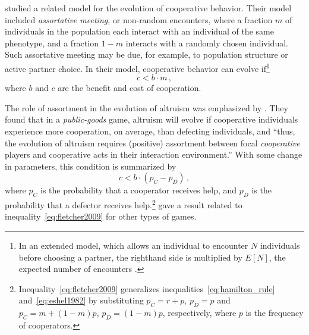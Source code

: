 \documentclass[12pt]{extarticle}
\begin{document}
\citet{Eshel1982} studied a related model for the evolution of cooperative behavior.
Their model included \emph{assortative meeting}, or non-random encounters, where a fraction $m$ of individuals in the population each interact with an individual of the same phenotype, and a fraction $1-m$ interacts  with a randomly chosen individual.  
Such assortative meeting may be due, for example, to population structure or active partner choice.
In their model, cooperative behavior can evolve if\footnote{In an extended model, which allows an individual to encounter $N$ individuals before choosing a partner, the righthand side is multiplied by $E[N]$, the expected number of encounters \citep[eq.~4.6]{Eshel1982}.
} 
\citep[eq.~3.2]{Eshel1982}
\begin{equation} \label{eq:eshel1982}
c < b \cdot m \,,
\end{equation}
where $b$ and $c$ are the benefit and cost of cooperation. 

The role of assortment in the evolution of altruism was emphasized by \citet{Fletcher2009assortment}.
They found that in a \emph{public-goods} game, altruism will evolve if cooperative individuals experience more cooperation, on average, than defecting individuals, and ``thus, the evolution of altruism requires (positive) assortment between focal \emph{cooperative} players and cooperative acts in their interaction environment.''
With some change in parameters, this condition is summarized by \citep[eq.~2.3]{Fletcher2009assortment}
\begin{equation} \label{eq:fletcher2009}
c < b \cdot (p_C - p_D ) \,,
\end{equation}
where $p_C$ is the probability that a cooperator receives help, and $p_D$ is the probability that a defector receives help.\footnote{Inequality~\ref{eq:fletcher2009} generalizes inequalities~\ref{eq:hamilton_rule} and~\ref{eq:eshel1982} by substituting $p_C=r + p$, $p_D=p$ and $p_C=m + (1-m)p$, $p_D=(1-m)p$, respectively, where $p$ is the frequency of cooperators.}
\citet{Bijma2010assortment} gave a result related to inequality~\ref{eq:fletcher2009} for other types of games.
\end{document}
